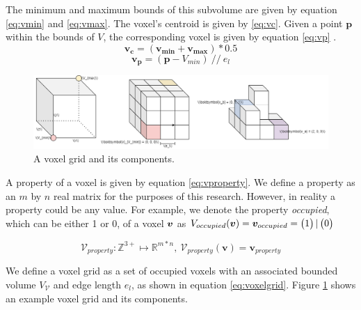 The minimum and maximum bounds of this subvolume are given by equation \ref{eq:vmin} and \ref{eq:vmax}. The voxel's centroid is given by \ref{eq:vc}. Given a point \(\boldsymbol{p}\) within the bounds of \(V\), the corresponding voxel is given by equation \ref{eq:vp} . 
\begin{equation}
    \label{eq:vc}
    \boldsymbol{v_c} = (\boldsymbol{v_{min}} + \boldsymbol{v_{max}})*0.5
\end{equation}
\begin{equation}
    \label{eq:vp}
    \boldsymbol{v_p} = (\boldsymbol{p} - V_{min})\ //\ e_l
\end{equation}


\begin{figure}[h]
    \centering
    \includegraphics*[width=\textwidth]{./fig/voxels_basic.png}
    \caption{A voxel grid and its components.}
    \label{fig:vg_basic}
\end{figure}

A property of a voxel is given by equation \ref{eq:vproperty}. We define a property as an \(m\) by \(n\) real matrix for the purposes of this research. However, in reality a property could be any value. For example, we denote the property \textit{occupied}, which can be either 1 or 0, of a voxel \(\boldsymbol{v}\) as \(V_{occupied}(\boldsymbol{v}) = \boldsymbol{v}_{occupied} = \begin{pmatrix} 1 \end{pmatrix} | \begin{pmatrix} 0 \end{pmatrix}\)

\begin{equation}
    \label{eq:vproperty}
    \mathcal{V}_{property}: \mathbb{Z}^{3+} \mapsto \mathbb{R}^{m*n},\ \mathcal{V}_{property}(\boldsymbol{v}) = \boldsymbol{v}_{property}
\end{equation}

We define a voxel grid as a set of occupied voxels with an associated bounded volume \(V_{\mathcal{V}}\) and edge length \(e_{l}\), as shown in equation \ref{eq:voxelgrid}. Figure \ref{fig:vg_basic} shows an example voxel grid and its components.

